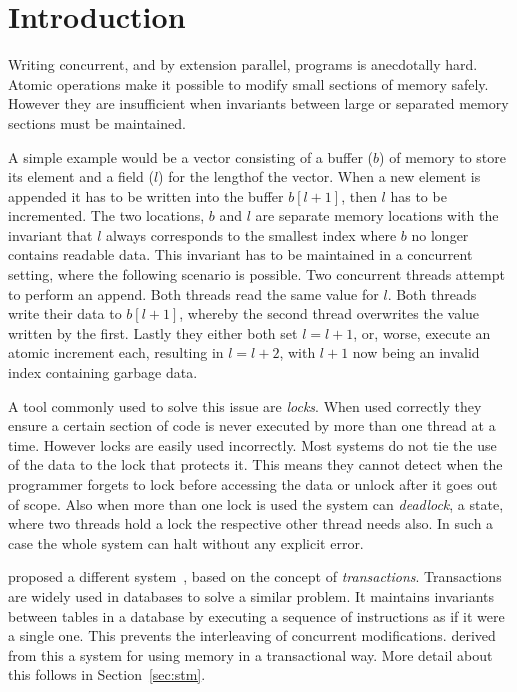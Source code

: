 \section{Introduction}

\label{sec:introduction}

Writing concurrent, and by extension parallel, programs is anecdotally hard.
Atomic operations make it possible to modify small sections of memory safely.
However they are insufficient when invariants between large or separated memory
sections must be maintained.

A simple example would be a vector consisting of a buffer ($b$) of memory to
store its element and a field ($l$) for the lengthof the vector. When a new
element is appended it has to be written into the buffer $b[l + 1]$, then $l$
has to be incremented. The two locations, $b$ and $l$ are separate memory
locations with the invariant that $l$ always corresponds to the smallest index
where $b$ no longer contains readable data. This invariant has to be maintained
in a concurrent setting, where the following scenario is possible. Two
concurrent threads attempt to perform an append. Both threads read the same
value for $l$. Both threads write their data to $b[l+1]$, whereby the second
thread overwrites the value written by the first. Lastly they either both set $l
= l + 1$, or, worse, execute an atomic increment each, resulting in $l = l + 2$,
with $l+1$ now being an invalid index containing garbage data.

A tool commonly used to solve this issue are \emph{locks}. When used correctly
they ensure a certain section of code is never executed by more than one thread
at a time. However locks are easily used incorrectly. Most systems do not tie
the use of the data to the lock that protects it. This means they cannot detect
when the programmer forgets to lock before accessing the data or unlock after it
goes out of scope. Also when more than one lock is used the system can
\emph{deadlock}, a state, where two threads hold a lock the respective other
thread needs also. In such a case the whole system can halt without any explicit
error.

\citeauthor{tm-origins} proposed a different system~\cite{tm-origins}, based on
the concept of \emph{transactions}. Transactions are widely used in databases to
solve a similar problem. It maintains invariants between tables in a database by
executing a sequence of instructions as if it were a single one. This prevents
the interleaving of concurrent modifications. \citeauthor{tm-origins} derived from
this a system for using memory in a transactional way. More detail about this
follows in Section~\ref{sec:stm}.

